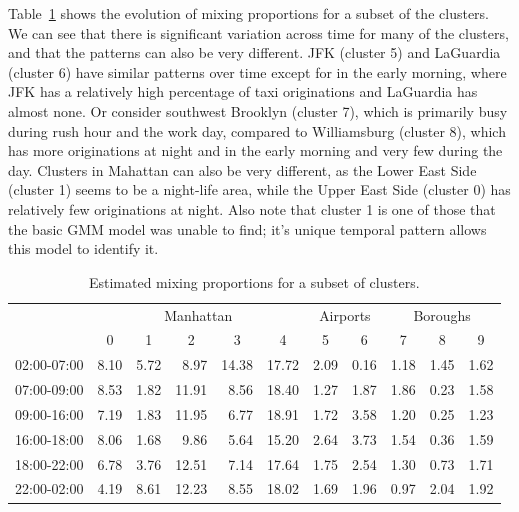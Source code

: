 \documentclass[12pt]{article}
\theoremstyle{definition}
\theoremstyle{algodesc}
\begin{document}
Table~\ref{tab:mixing} shows the evolution of mixing proportions for a subset of the clusters. We can see that there is significant variation across time for many of the clusters, and that the patterns can also be very different. JFK (cluster 5) and LaGuardia (cluster 6) have similar patterns over time except for in the early morning, where JFK has a relatively high percentage of taxi originations and LaGuardia has almost none. Or consider southwest Brooklyn (cluster 7), which is primarily busy during rush hour and the work day, compared to Williamsburg (cluster 8), which has more originations at night and in the early morning and very few during the day. Clusters in Mahattan can also be very different, as the Lower East Side (cluster 1) seems to be a night-life area, while the Upper East Side (cluster 0) has relatively few originations at night. Also note that cluster 1 is one of those that the basic GMM model was unable to find; it's unique temporal pattern allows this model to identify it.

\begin{table}[H] \centering
\begin{tabular}{rrrrrrrrrrr}
  \toprule
   & \multicolumn{5}{c}{Manhattan} & \multicolumn{2}{c}{Airports} & \multicolumn{3}{c}{Boroughs} \\
   \cmidrule(lr){2-6} \cmidrule(lr){7-8} \cmidrule(lr){9-11}
   & \multicolumn{1}{c}{0} & \multicolumn{1}{c}{1} & \multicolumn{1}{c}{2} & \multicolumn{1}{c}{3} & \multicolumn{1}{c}{4} & \multicolumn{1}{c}{5} & \multicolumn{1}{c}{6} & \multicolumn{1}{c}{7} & \multicolumn{1}{c}{8} & \multicolumn{1}{c}{9} \\
  \midrule
  02:00-07:00 &  8.10 &  5.72 &  8.97 & 14.38 & 17.72 &  2.09 &  0.16 &  1.18 &  1.45 &  1.62 \\
  07:00-09:00 &  8.53 &  1.82 & 11.91 &  8.56 & 18.40 &  1.27 &  1.87 &  1.86 &  0.23 &  1.58 \\
  09:00-16:00 &  7.19 &  1.83 & 11.95 &  6.77 & 18.91 &  1.72 &  3.58 &  1.20 &  0.25 &  1.23  \\
  16:00-18:00 &  8.06 &  1.68 &  9.86 &  5.64 & 15.20 &  2.64 &  3.73 &  1.54 &  0.36 &  1.59 \\
  18:00-22:00 &  6.78 &  3.76 & 12.51 &  7.14 & 17.64 &  1.75 &  2.54 &  1.30 &  0.73 &  1.71 \\
  22:00-02:00 &  4.19 &  8.61 & 12.23 &  8.55 & 18.02 &  1.69 &  1.96 &  0.97 &  2.04 &  1.92 \\
  \bottomrule
\end{tabular}
\caption{Estimated mixing proportions for a subset of clusters.}
\label{tab:mixing}
\end{table}
\end{document}
